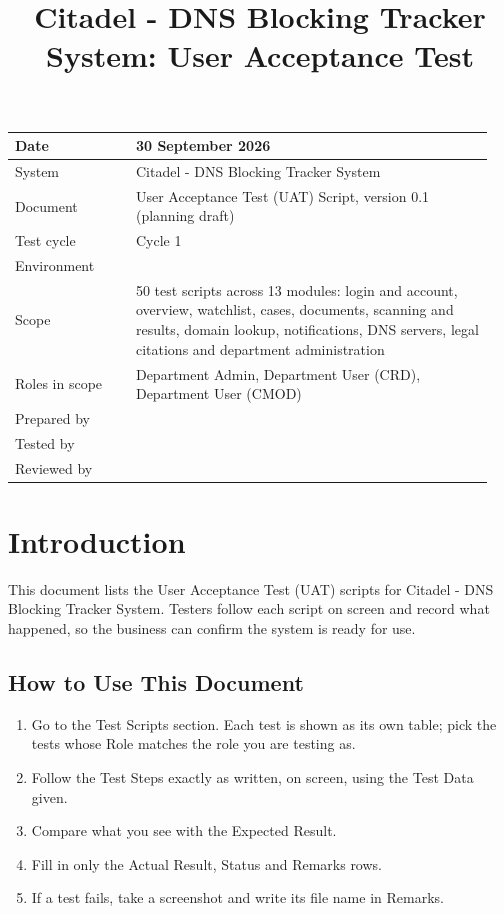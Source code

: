 \documentclass[10pt]{article}
\title{Citadel - DNS Blocking Tracker System: User Acceptance Test}
\author{}
\date{}
\begin{document}
\maketitle
\thispagestyle{fancy}

\begin{longtable}{p{0.24\linewidth}p{0.71\linewidth}}
\hline
Date & 30 September 2026 \\ \hline
System & Citadel - DNS Blocking Tracker System \\ \hline
Document & User Acceptance Test (UAT) Script, version 0.1 (planning draft) \\ \hline
Test cycle & Cycle 1 \\ \hline
Environment & \\ \hline
Scope & 50 test scripts across 13 modules: login and account, overview, watchlist, cases, documents, scanning and results, domain lookup, notifications, DNS servers, legal citations and department administration \\ \hline
Roles in scope & Department Admin, Department User (CRD), Department User (CMOD) \\ \hline
Prepared by & \\ \hline
Tested by & \\ \hline
Reviewed by & \\ \hline
\end{longtable}

\clearpage
\tableofcontents
\clearpage

\section{Introduction}
This document lists the User Acceptance Test (UAT) scripts for Citadel - DNS Blocking Tracker System. Testers follow each script on screen and record what happened, so the business can confirm the system is ready for use.

\subsection{How to Use This Document}
\begin{enumerate}
\item Go to the Test Scripts section. Each test is shown as its own table; pick the tests whose Role matches the role you are testing as.
\item Follow the Test Steps exactly as written, on screen, using the Test Data given.
\item Compare what you see with the Expected Result.
\item Fill in only the Actual Result, Status and Remarks rows.
\item If a test fails, take a screenshot and write its file name in Remarks.
\end{enumerate}
\end{document}
